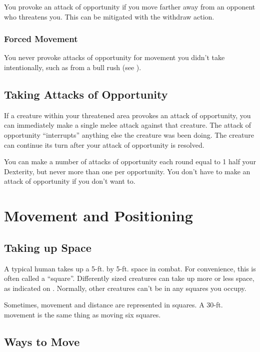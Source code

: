  You provoke an attack of opportunity if you move farther away from an opponent who threatens you. This can be mitigated with the withdraw action.

\subsubsection{Forced Movement} You never provoke attacks of opportunity for movement you didn't take intentionally, such as from a bull rush (see ).

\subsection{Taking Attacks of Opportunity}
If a creature within your threatened area provokes an attack of opportunity, you can immediately make a single melee attack against that creature. The attack of opportunity ``interrupts'' anything else the creature was been doing. The creature can continue its turn after your attack of opportunity is resolved.

You can make a number of attacks of opportunity each round equal to 1 \add half your Dexterity, but never more than one per opportunity. You don't have to make an attack of opportunity if you don't want to.

\section{Movement and Positioning}

\subsection{Taking up Space}
A typical human takes up a 5-ft. by 5-ft. space in combat. For convenience, this is often called a ``square''. Differently sized creatures can take up more or less space, as indicated on . Normally, other creatures can't be in any squares you occupy.

Sometimes, movement and distance are represented in squares. A 30-ft. movement is the same thing as moving six squares.

\subsection{Ways to Move}

